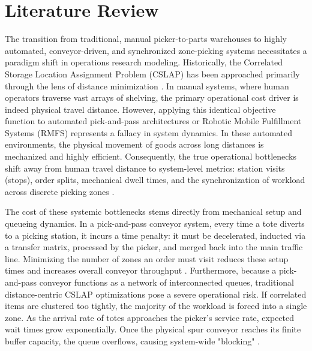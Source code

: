 \documentclass[preprint,review,11pt,authoryear]{elsarticle}
\begin{document}



\section{Literature Review}\label{sec:lit_review}

The transition from traditional, manual picker-to-parts warehouses to highly automated, conveyor-driven, and synchronized zone-picking systems necessitates a paradigm shift in operations research modeling. Historically, the Correlated Storage Location Assignment Problem (CSLAP) has been approached primarily through the lens of distance minimization \cite{islam2023}. In manual systems, where human operators traverse vast arrays of shelving, the primary operational cost driver is indeed physical travel distance. However, applying this identical objective function to automated pick-and-pass architectures or Robotic Mobile Fulfillment Systems (RMFS) \cite{azadeh2019} represents a fallacy in system dynamics. In these automated environments, the physical movement of goods across long distances is mechanized and highly efficient. Consequently, the true operational bottlenecks shift away from human travel distance to system-level metrics: station visits (stops), order splits, mechanical dwell times, and the synchronization of workload across discrete picking zones \cite{xie2021}.

The cost of these systemic bottlenecks stems directly from mechanical setup and queueing dynamics. In a pick-and-pass conveyor system, every time a tote diverts to a picking station, it incurs a time penalty: it must be decelerated, inducted via a transfer matrix, processed by the picker, and merged back into the main traffic line. Minimizing the number of zones an order must visit reduces these setup times and increases overall conveyor throughput \cite{zhu2021}. Furthermore, because a pick-and-pass conveyor functions as a network of interconnected queues, traditional distance-centric CSLAP optimizations pose a severe operational risk. If correlated items are clustered too tightly, the majority of the workload is forced into a single zone. As the arrival rate of totes approaches the picker's service rate, expected wait times grow exponentially. Once the physical spur conveyor reaches its finite buffer capacity, the queue overflows, causing system-wide "blocking" \cite{kim2020}. 
\end{document}
